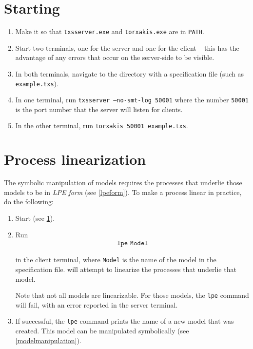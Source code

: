 \section{Starting \txs{}} \label{starttxs}

\begin{enumerate}
\item Make it so that \texttt{txsserver.exe} and \texttt{torxakis.exe} are in \texttt{PATH}.
\item Start two terminals, one for the \txs{} server and one for the \txs{} client -- this has the advantage of any errors that occur on the server-side to be visible.
\item In both terminals, navigate to the directory with a \txs{} specification file (such as \texttt{example.txs}).
\item In one terminal, run \texttt{txsserver --no-smt-log 50001} where the number \texttt{50001} is the port number that the \txs{} server will listen for clients.
\item In the other terminal, run \texttt{torxakis 50001 example.txs}.
\end{enumerate}

\section{Process linearization} \label{processlinearization}

The symbolic manipulation of \txs{} models requires the processes that underlie those models to be in \emph{LPE form} (see \ref{lpeform}).
To make a \txs{} process linear in practice, do the following:

\begin{enumerate}
\item Start \txs{} (see \ref{starttxs}).
\item Run
\begin{align*}
\texttt{lpe Model}
\end{align*}

in the client terminal, where \texttt{Model} is the name of the model in the \txs{} specification file.
\txs{} will attempt to linearize the processes that underlie that model.

Note that not all \txs{} models are linearizable.
For those models, the \texttt{lpe} command will fail, with an error reported in the server terminal.
\item If successful, the \texttt{lpe} command prints the name of a new \txs{} model that was created.
This model can be manipulated symbolically (see \ref{modelmanipulation}).
\end{enumerate}

